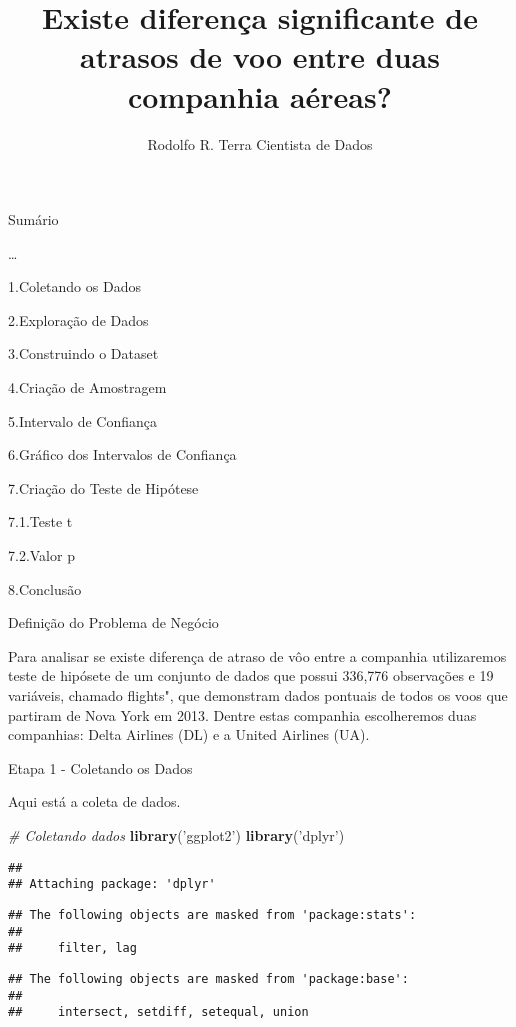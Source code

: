 \documentclass[]{article}
\title{Existe diferença significante de atrasos de voo entre duas companhia
aéreas?}
\author{Rodolfo R. Terra \textbar{} Cientista de Dados}
\date{}
\newenvironment{Shaded}{\begin{snugshade}}{\end{snugshade}}
\newcommand{\CommentTok}[1]{\textcolor[rgb]{0.56,0.35,0.01}{\textit{#1}}}
\newcommand{\KeywordTok}[1]{\textcolor[rgb]{0.13,0.29,0.53}{\textbf{#1}}}
\newcommand{\NormalTok}[1]{#1}
\newcommand{\StringTok}[1]{\textcolor[rgb]{0.31,0.60,0.02}{#1}}
\begin{document}
\maketitle

Sumário

\ldots{}

1.Coletando os Dados

2.Exploração de Dados

3.Construindo o Dataset

4.Criação de Amostragem

5.Intervalo de Confiança

6.Gráfico dos Intervalos de Confiança

7.Criação do Teste de Hipótese

7.1.Teste t

7.2.Valor p

8.Conclusão

Definição do Problema de Negócio

Para analisar se existe diferença de atraso de vôo entre a companhia
utilizaremos teste de hipósete de um conjunto de dados que possui
336,776 observações e 19 variáveis, chamado flights", que demonstram
dados pontuais de todos os voos que partiram de Nova York em 2013.
Dentre estas companhia escolheremos duas companhias: Delta Airlines (DL)
e a United Airlines (UA).

Etapa 1 - Coletando os Dados

Aqui está a coleta de dados.

\begin{Shaded}
\begin{Highlighting}[]
\CommentTok{# Coletando dados}
\KeywordTok{library}\NormalTok{(}\StringTok{'ggplot2'}\NormalTok{)}
\KeywordTok{library}\NormalTok{(}\StringTok{'dplyr'}\NormalTok{)}
\end{Highlighting}
\end{Shaded}

\begin{verbatim}
## 
## Attaching package: 'dplyr'
\end{verbatim}

\begin{verbatim}
## The following objects are masked from 'package:stats':
## 
##     filter, lag
\end{verbatim}

\begin{verbatim}
## The following objects are masked from 'package:base':
## 
##     intersect, setdiff, setequal, union
\end{verbatim}
\end{document}
